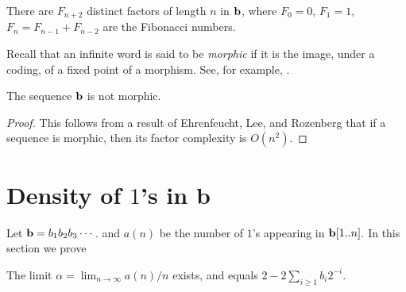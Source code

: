 \documentclass[12pt,reqno]{article}
\begin{document}
\begin{corollary}
There are $F_{n+2}$ distinct factors of length $n$ in $\bf b$,
where $F_0 = 0$, $F_1 = 1$, $F_n = F_{n-1} + F_{n-2}$ are the
Fibonacci numbers.
\label{corfac}
\end{corollary}

Recall that an infinite word is said to be {\it morphic} if
it is the image, under a coding, of a fixed point of a morphism.
See, for example, \cite{Allouche&Shallit:2003}.

\begin{corollary}
The sequence $\bf b$ is not morphic.
\end{corollary}

\begin{proof}
This follows from a result of Ehrenfeucht, Lee, and Rozenberg
\cite{Ehrenfeucht&Lee&Rozenberg:1975} that if a sequence
is morphic, then its factor complexity is $O(n^2)$.
\end{proof}

\section{Density of $1$'s in {\bf b}}

Let ${\bf b} = b_1 b_2 b_3 \cdots$.
and $a(n)$ be the number of $1$'s appearing in ${\bf b}[1..n]$.
In this section we prove

\begin{theorem}
The limit $\alpha = \lim_{n \rightarrow \infty} a(n)/n$ exists, and
equals $2 - 2 \sum_{i \geq 1} b_i 2^{-i}$.
\end{theorem}
\end{document}

